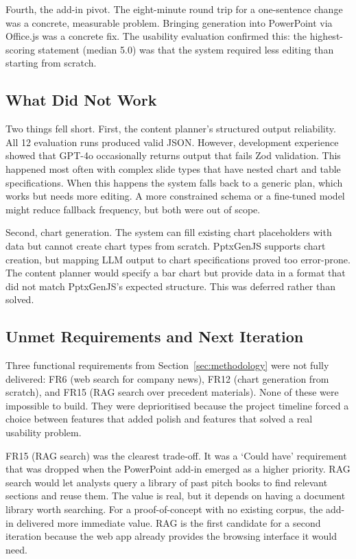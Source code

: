 Fourth, the add-in pivot. The eight-minute round trip for a one-sentence change was a concrete, measurable problem. Bringing generation into PowerPoint via Office.js was a concrete fix. The usability evaluation confirmed this: the highest-scoring statement (median 5.0) was that the system required less editing than starting from scratch.

\subsection{What Did Not Work}

Two things fell short. First, the content planner's structured output reliability. All 12 evaluation runs produced valid JSON. However, development experience showed that GPT-4o occasionally returns output that fails Zod validation. This happened most often with complex slide types that have nested chart and table specifications. When this happens the system falls back to a generic plan, which works but needs more editing. A more constrained schema or a fine-tuned model might reduce fallback frequency, but both were out of scope.

Second, chart generation. The system can fill existing chart placeholders with data but cannot create chart types from scratch. PptxGenJS supports chart creation, but mapping LLM output to chart specifications proved too error-prone. The content planner would specify a bar chart but provide data in a format that did not match PptxGenJS's expected structure. This was deferred rather than solved.

\subsection{Unmet Requirements and Next Iteration}

Three functional requirements from Section~\ref{sec:methodology} were not fully delivered: FR6 (web search for company news), FR12 (chart generation from scratch), and FR15 (RAG search over precedent materials). None of these were impossible to build. They were deprioritised because the project timeline forced a choice between features that added polish and features that solved a real usability problem.

FR15 (RAG search) was the clearest trade-off. It was a `Could have' requirement that was dropped when the PowerPoint add-in emerged as a higher priority. RAG search would let analysts query a library of past pitch books to find relevant sections and reuse them. The value is real, but it depends on having a document library worth searching. For a proof-of-concept with no existing corpus, the add-in delivered more immediate value. RAG is the first candidate for a second iteration because the web app already provides the browsing interface it would need.

